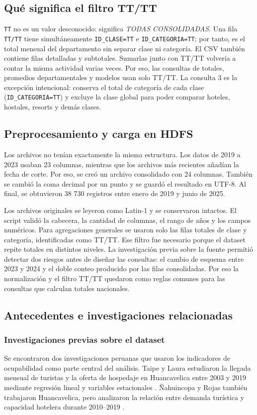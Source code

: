 \documentclass[10pt,a4paper]{article}
\theoremstyle{definition}
\begin{document}
\subsection{Qué significa el filtro TT/TT}
\texttt{TT} no es un valor desconocido: significa \emph{TODAS CONSOLIDADAS}.
Una fila \texttt{TT/TT} tiene simultáneamente
\texttt{ID\_CLASE=TT} e \texttt{ID\_CATEGORIA=TT}; por tanto, es el total mensual
del departamento sin separar clase ni categoría. El CSV también contiene filas
detalladas y subtotales. Sumarlas junto con TT/TT volvería a contar la misma
actividad varias veces. Por eso, las consultas de totales, promedios
departamentales y modelos usan solo TT/TT. La consulta 3 es la excepción
intencional: conserva el total de categoría de cada clase
(\texttt{ID\_CATEGORIA=TT}) y excluye la clase global para poder comparar
hoteles, hostales, resorts y demás clases.

\subsection{Preprocesamiento y carga en HDFS}
Los archivos no tenían exactamente la misma estructura. Los datos de 2019 a
2023 usaban 23 columnas, mientras que los archivos más recientes añadían la
fecha de corte. Por eso, se creó un archivo consolidado con 24 columnas. También
se cambió la coma decimal por un punto y se guardó el resultado en UTF-8. Al
final, se obtuvieron 38 730 registros entre enero de 2019 y junio de 2025.

Los archivos originales se leyeron como Latin-1 y se conservaron intactos. El
script validó la cabecera, la cantidad de columnas, el rango de años y los
campos numéricos. Para agregaciones generales se usaron solo las filas totales
de clase y categoría, identificadas como TT/TT. Ese filtro fue necesario porque
el dataset repite totales en distintos niveles. La investigación previa sobre
la fuente permitió detectar dos riesgos antes de diseñar las consultas: el
cambio de esquema entre 2023 y 2024 y el doble conteo producido por las filas
consolidadas. Por eso la normalización y el filtro TT/TT quedaron como reglas
comunes para las consultas que calculan totales nacionales.

\subsection{Antecedentes e investigaciones relacionadas}
\subsubsection{Investigaciones previas sobre el dataset}
Se encontraron dos investigaciones peruanas que usaron los indicadores de
ocupabilidad como parte central del análisis. Taipe y Laura estudiaron la
llegada mensual de turistas y la oferta de hospedaje en Huancavelica entre
2003 y 2019 mediante regresión lineal y variables estacionales
\cite{taipe_laura_desestacionalizacion2021}. Ñahuincopa y Rojas también
trabajaron Huancavelica, pero analizaron la relación entre demanda turística y
capacidad hotelera durante 2010--2019 \cite{nahuincopa_rojas_demanda2022}.
\end{document}
